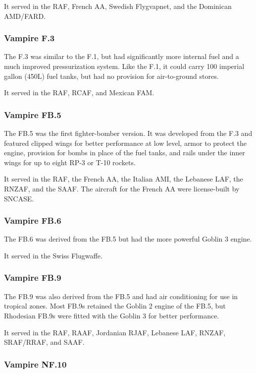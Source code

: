 It served in the RAF, French AA, Swedish Flygvapnet, and the Dominican AMD/FARD.

\subsubsection{Vampire F.3}

The F.3 was similar to the F.1, but had significantly more internal fuel and a much improved pressurization system. Like the F.1, it could carry 100 imperial gallon (450L) fuel tanks, but had no provision for air-to-ground stores.

It served in the RAF, RCAF, and Mexican FAM.

\subsubsection{Vampire FB.5}

The FB.5 was the first fighter-bomber version. It was developed from the F.3 and featured clipped wings for better performance at low level, armor to protect the engine, provision for bombs in place of the fuel tanks, and rails under the inner wings for up to eight RP-3 or T-10 rockets.

It served in the RAF, the French AA, the Italian AMI, the Lebanese LAF, the RNZAF, and the SAAF. The aircraft for the French AA were license-built by SNCASE.

\subsubsection{Vampire FB.6}

The FB.6 was derived from the FB.5 but had the more powerful Goblin 3 engine.

It served in the Swiss Flugwaffe.

\subsubsection{Vampire FB.9}

The FB.9 was also derived from the FB.5 and had air conditioning for use in tropical zones. Most FB.9s retained the Goblin 2 engine of the FB.5, but Rhodesian FB.9s were fitted with the Goblin 3 for better performance.

It served in the RAF, RAAF, Jordanian RJAF, Lebanese LAF, RNZAF, SRAF/RRAF, and SAAF.

\subsubsection{Vampire NF.10}

